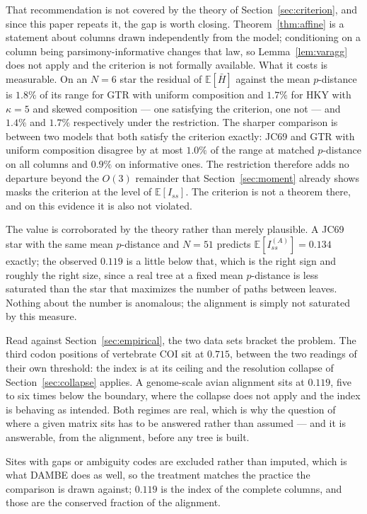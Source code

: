 \documentclass[preprint,12pt,authoryear]{elsarticle}
\newcommand{\Iss}{I_{ss}}
\newcommand{\Hbar}{\bar H}
\newcommand{\E}{\mathbb{E}}
\theoremstyle{definition}
\theoremstyle{remark}
\begin{document}
That recommendation is not covered by the theory of
Section~\ref{sec:criterion}, and since this paper repeats it, the gap is
worth closing. Theorem~\ref{thm:affine} is a statement about columns drawn
independently from the model; conditioning on a column being
parsimony-informative changes that law, so Lemma~\ref{lem:varagg} does not
apply and the criterion is not formally available. What it costs is
measurable. On an $N=6$ star the residual of $\E[\Hbar]$ against the mean
$p$-distance is $1.8\%$ of its range for GTR with uniform composition and
$1.7\%$ for HKY with $\kappa=5$ and skewed composition --- one satisfying the
criterion, one not --- and $1.4\%$ and $1.7\%$ respectively under the
restriction. The sharper comparison is between two models that both satisfy
the criterion exactly: JC69 and GTR with uniform composition disagree by at
most $1.0\%$ of the range at matched $p$-distance on all columns and $0.9\%$
on informative ones. The restriction therefore adds no departure beyond the
$O(3)$ remainder that Section~\ref{sec:moment} already shows masks the
criterion at the level of $\E[\Iss]$. The criterion is not a theorem there,
and on this evidence it is also not violated.

The value is corroborated by the theory rather than merely plausible. A JC69
star with the same mean $p$-distance and $N=51$ predicts
$\E[\Iss^{(A)}]=0.134$ exactly; the observed $0.119$ is a little below that,
which is the right sign and roughly the right size, since a real tree at a
fixed mean $p$-distance is less saturated than the star that maximizes the
number of paths between leaves. Nothing about the number is anomalous; the
alignment is simply not saturated by this measure.

Read against Section~\ref{sec:empirical}, the two data sets bracket the
problem. The third codon positions of vertebrate COI sit at $0.715$, between
the two readings of their own threshold: the index is at its ceiling and the
resolution collapse of Section~\ref{sec:collapse} applies. A genome-scale avian alignment sits at
$0.119$, five to six times below the boundary, where the collapse does
not apply and the index is behaving as intended. Both regimes are real, which
is why the question of where a given matrix sits has to be answered rather
than assumed --- and it is answerable, from the alignment, before any tree is
built.

Sites with gaps or ambiguity codes are excluded rather than imputed, which is
what DAMBE does as well, so the treatment matches the practice the comparison
is drawn against; $0.119$ is the index of the complete columns, and those are
the conserved fraction of the alignment.
\end{document}
